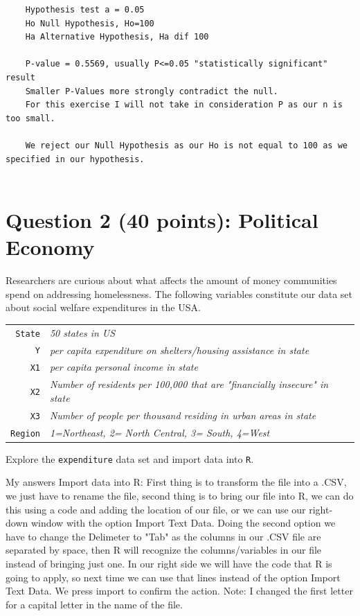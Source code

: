 \documentclass[12pt,letterpaper]{article}
\begin{document}
\begin{verbatim}
	Hypothesis test a = 0.05
	Ho Null Hypothesis, Ho=100
	Ha Alternative Hypothesis, Ha dif 100
	
	P-value = 0.5569, usually P<=0.05 "statistically significant" result
	Smaller P-Values more strongly contradict the null.
	For this exercise I will not take in consideration P as our n is too small.
	
	We reject our Null Hypothesis as our Ho is not equal to 100 as we specified in our hypothesis. 


\end{verbatim}

\newpage

	\section*{Question 2 (40 points): Political Economy}

\noindent Researchers are curious about what affects the amount of money communities spend on addressing homelessness. The following variables constitute our data set about social welfare expenditures in the USA. \\
\vspace{.5cm}


\begin{tabular}{r|l}
	\texttt{State} &\emph{50 states in US} \\
	\texttt{Y} & \emph{per capita expenditure on shelters/housing assistance in state}\\
	\texttt{X1} &\emph{per capita personal income in state} \\
	\texttt{X2} &  \emph{Number of residents per 100,000 that are "financially insecure" in state}\\
	\texttt{X3} &  \emph{Number of people per thousand residing in urban areas in state} \\
	\texttt{Region} &  \emph{1=Northeast, 2= North Central, 3= South, 4=West} \\
\end{tabular}

\vspace{.5cm}
\noindent Explore the \texttt{expenditure} data set and import data into \texttt{R}.
\vspace{.5cm}
  
\vspace{.5cm}


	My answers
	Import data into R:
	First thing is to transform the file into a .CSV, we just have to rename the file, second thing is to bring our file into R, we can do this using a code and adding the location of our file, or we can use our right-down window with the option Import Text Data. Doing the second option we have to change the Delimeter to "Tab" as the columns in our .CSV file are separated by space, then R will recognize the columns/variables in our file instead of bringing just one. In our right side we will have the code that R is going to apply, so next time we can use that lines instead of the option Import Text Data. We press import to confirm the action. 
	Note: I changed the first letter for a capital letter in the name of the file.
	
\end{document}
